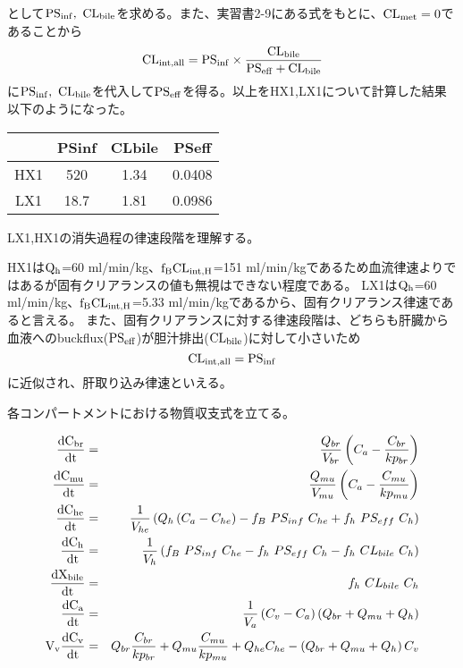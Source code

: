 \documentclass[a4paper,papersize,dvipdfmx]{jsarticle}
\begin{document}
として$\rm PS_{inf}, \ CL_{bile}$を求める。また、実習書2-9にある式をもとに、$\rm CL_{met} = 0$であることから
\[\rm CL_{int,all} = PS_{inf} \times \frac{CL_{bile}}{PS_{eff} + CL_{bile}}\]
に$\rm PS_{inf}, \ CL_{bile}$を代入して$\rm PS_{eff}$を得る。以上をHX1,LX1について計算した結果以下のようになった。


\begin{table}[H]
\begin{center}
\begin{tabular}{|c|c|c|c|}
\hline
& PSinf    & CLbile   & PSeff     \\ \hline
HX1 & 520 & 1.34 & 0.0408 \\ \hline
LX1 & 18.7  & 1.81  & 0.0986 \\ \hline
\end{tabular}
\end{center}
\end{table}


\begin{tcolorbox}[colback=white,colbacktitle=black!10!white,coltitle=black,title={(4)}]
LX1,HX1の消失過程の律速段階を理解する。
\end{tcolorbox}

HX1は$\rm Q_h$=60 ml/min/kg、$\rm f_BCL_{int,H}$=151 ml/min/kgであるため血流律速よりではあるが固有クリアランスの値も無視はできない程度である。
LX1は$\rm Q_h$=60 ml/min/kg、$\rm f_BCL_{int,H}$=5.33 ml/min/kgであるから、固有クリアランス律速であると言える。
また、固有クリアランスに対する律速段階は、どちらも肝臓から血液へのbuckflux($\rm PS_{eff}$)が胆汁排出($\rm CL_{bile}$)に対して小さいため
\[\rm CL_{int,all} = PS_{inf}\]
に近似され、肝取り込み律速といえる。


\begin{tcolorbox}[colback=white,colbacktitle=black!10!white,coltitle=black,title={(5)}]
各コンパートメントにおける物質収支式を立てる。
\end{tcolorbox}

\begin{eqnarray}
\rm \frac{dC_{br}}{dt} & = & \frac{Q_{br}}{V_{br}} \left(C_a - \frac{C_{br}}{kp_{br}}\right) \label{eq:c_br} \\
\rm \frac{dC_{mu}}{dt} & = & \frac{Q_{mu}}{V_{mu}} \left(C_a - \frac{C_{mu}}{kp_{mu}}\right) \label{eq:c_mu} \\
\rm \frac{dC_{he}}{dt} & = & \frac{1}{V_{he}} \left( Q_h\left(C_a - C_{he}\right) - f_B \ PS_{inf} \ C_{he} + f_h \ PS_{eff} \ C_h \right) \label{eq:c_he} \\
\rm \frac{dC_{h}}{dt} & = & \frac{1}{V_{h}} \left( f_B \ PS_{inf} \ C_{he} - f_h \ PS_{eff} \ C_{h} - f_h \ CL_{bile} \ C_h \right) \label{eq:c_h} \\
\rm \frac{dX_{bile}}{dt} & = & f_h \ CL_{bile} \ C_h \label{eq:x_bile} \\
\rm \frac{dC_{a}}{dt} & = & \frac{1}{V_a} \left(C_v - C_a \right)\left(Q_{br} + Q_{mu} + Q_h \right) \label{eq:c_a} \\
\rm V_v \frac{dC_{v}}{dt} & = & Q_{br}\frac{C_{br}}{kp_{br}} + Q_{mu}\frac{C_{mu}}{kp_{mu}} + Q_{he}C_{he} - \left( Q_{br} + Q_{mu} + Q_h\right) C_v \label{eq:c_v}
\end{eqnarray}
\end{document}
